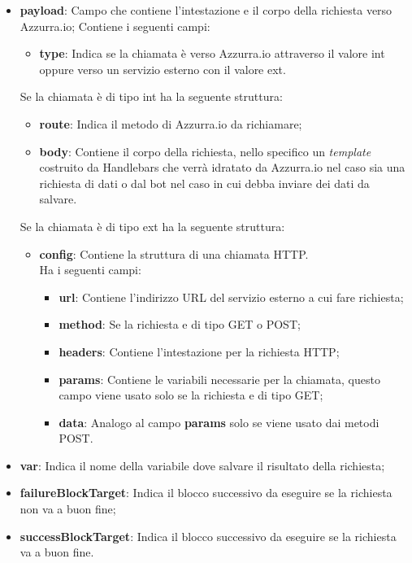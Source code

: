 \begin{itemize}
	\item \textbf{payload}: Campo che contiene l'intestazione e il corpo della richiesta verso Azzurra.io;
	Contiene i seguenti campi:
	\begin{itemize}
		\item \textbf{type}: Indica se la chiamata è verso Azzurra.io attraverso il valore \textsf{int} oppure verso un servizio esterno con il valore \textsf{ext}.
	\end{itemize}
	Se la chiamata è di tipo int ha la seguente struttura:
	\begin{itemize}
		\item \textbf{route}: Indica il metodo di Azzurra.io da richiamare;
		\item \textbf{body}: Contiene il corpo della richiesta, nello specifico un \emph{template} costruito da Handlebars che verrà idratato da Azzurra.io nel caso sia una richiesta di dati o dal bot nel caso in cui debba inviare dei dati da salvare.
	\end{itemize}
	Se la chiamata è di tipo ext ha la seguente struttura:
	\begin{itemize}
		\item \textbf{config}: Contiene la struttura di una chiamata HTTP.\\
		Ha i seguenti campi:
		\begin{itemize}
			\item \textbf{url}: Contiene l'indirizzo URL del servizio esterno a cui fare richiesta;
			\item \textbf{method}: Se la richiesta e di tipo GET o POST;
			\item \textbf{headers}: Contiene l'intestazione per la richiesta HTTP;
			\item \textbf{params}: Contiene le variabili necessarie per la chiamata, questo campo viene usato solo se la richiesta e di tipo GET;
			\item \textbf{data}: Analogo al campo \textbf{params} solo se viene usato dai metodi POST.
		\end{itemize}
	\end{itemize}
	\item \textbf{var}: Indica il nome della variabile dove salvare il risultato della richiesta;
	\item \textbf{failureBlockTarget}: Indica il blocco successivo da eseguire se la richiesta non va a buon fine;
	\item \textbf{successBlockTarget}: Indica il blocco successivo da eseguire se la richiesta va a buon fine.
\end{itemize}

